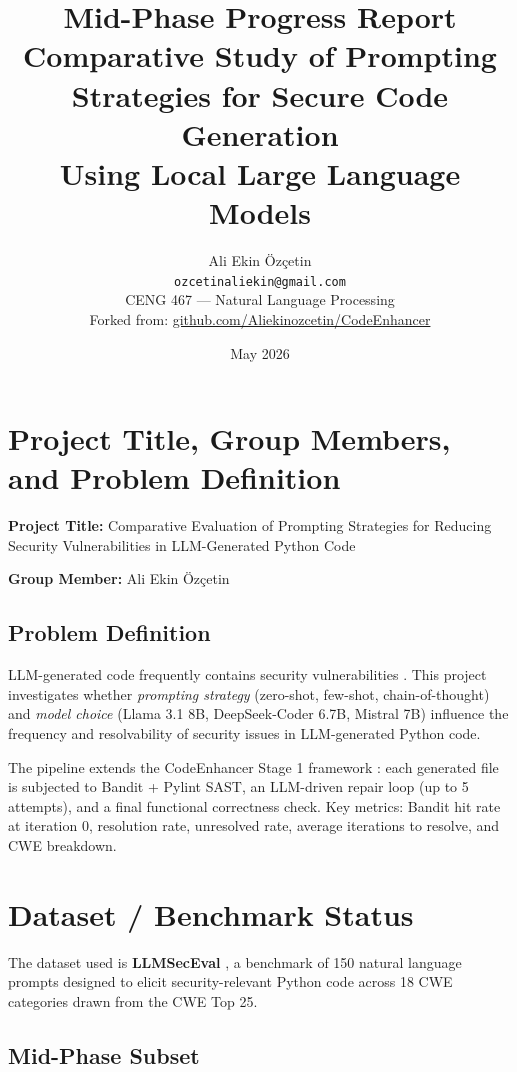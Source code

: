 \documentclass[10pt,a4paper]{article}
\title{
    \textbf{Mid-Phase Progress Report} \\[0.5em]
    \large Comparative Study of Prompting Strategies for Secure Code Generation \\
    Using Local Large Language Models
}
\author{
    Ali Ekin Özçetin \\
    \texttt{ozcetinaliekin@gmail.com} \\[0.5em]
    \small CENG 467 — Natural Language Processing \\
    \small Forked from: \href{https://github.com/Aliekinozcetin/CodeEnhancer}{github.com/Aliekinozcetin/CodeEnhancer}
}
\date{May 2026}
\begin{document}
\maketitle

\section{Project Title, Group Members, and Problem Definition}

\textbf{Project Title:} Comparative Evaluation of Prompting Strategies for Reducing Security Vulnerabilities in LLM-Generated Python Code

\textbf{Group Member:} Ali Ekin Özçetin

\subsection*{Problem Definition}

LLM-generated code frequently contains security vulnerabilities \cite{pearce2022asleep,tony2023llmseceval}. This project investigates whether \emph{prompting strategy} (zero-shot, few-shot, chain-of-thought) and \emph{model choice} (Llama 3.1 8B, DeepSeek-Coder 6.7B, Mistral 7B) influence the frequency and resolvability of security issues in LLM-generated Python code.

The pipeline extends the CodeEnhancer Stage 1 framework \cite{nishida2024codeenhancer}: each generated file is subjected to Bandit + Pylint SAST, an LLM-driven repair loop (up to 5 attempts), and a final functional correctness check. Key metrics: Bandit hit rate at iteration 0, resolution rate, unresolved rate, average iterations to resolve, and CWE breakdown.

\section{Dataset / Benchmark Status}

The dataset used is \textbf{LLMSecEval} \cite{tony2023llmseceval}, a benchmark of 150 natural language prompts designed to elicit security-relevant Python code across 18 CWE categories drawn from the CWE Top 25.

\subsection*{Mid-Phase Subset}
\end{document}
